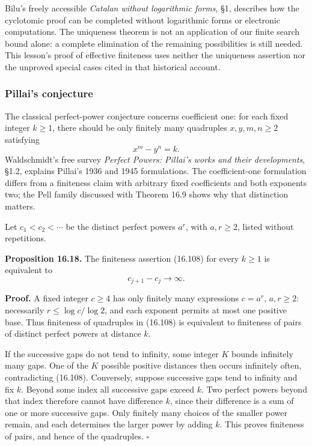 \documentclass[
  11pt,
  a4paper,
]{article}
\begin{document}
Bilu's freely accessible \emph{Catalan without logarithmic forms}, §1,
describes how the cyclotomic proof can be completed without logarithmic
forms or electronic computations. The uniqueness theorem is not an
application of our finite search bound alone: a complete elimination of
the remaining possibilities is still needed. This lesson's proof of
effective finiteness uses neither the uniqueness assertion nor the
unproved special cases cited in that historical account.

\subsubsection{Pillai's conjecture}\label{pillais-conjecture}

The classical perfect-power conjecture concerns coefficient one: for
each fixed integer \(k\ge1\), there should be only finitely many
quadruples \(x,y,m,n\ge2\) satisfying \[
 x^m-y^n=k.
 \tag{16.108}
\] Waldschmidt's free survey \emph{Perfect Powers: Pillai's works and
their developments}, §1.2, explains Pillai's 1936 and 1945 formulations.
The coefficient-one formulation differs from a finiteness claim with
arbitrary fixed coefficients and both exponents two; the Pell family
discussed with Theorem 16.9 shows why that distinction matters.

Let \(c_1<c_2<\cdots\) be the distinct perfect powers \(a^r\), with
\(a,r\ge2\), listed without repetitions.

\textbf{Proposition 16.18.} The finiteness assertion (16.108) for every
\(k\ge1\) is equivalent to \[
 c_{j+1}-c_j\longrightarrow\infty.
 \tag{16.109}
\]

\textbf{Proof.} A fixed integer \(c\ge4\) has only finitely many
expressions \(c=a^r\), \(a,r\ge2\): necessarily \(r\le\log c/\log2\),
and each exponent permits at most one positive base. Thus finiteness of
quadruples in (16.108) is equivalent to finiteness of pairs of distinct
perfect powers at distance \(k\).

If the successive gaps do not tend to infinity, some integer \(K\)
bounds infinitely many gaps. One of the \(K\) possible positive
distances then occurs infinitely often, contradicting (16.108).
Conversely, suppose successive gaps tend to infinity and fix \(k\).
Beyond some index all successive gaps exceed \(k\). Two perfect powers
beyond that index therefore cannot have difference \(k\), since their
difference is a sum of one or more successive gaps. Only finitely many
choices of the smaller power remain, and each determines the larger
power by adding \(k\). This proves finiteness of pairs, and hence of the
quadruples. \(\square\)
\end{document}
